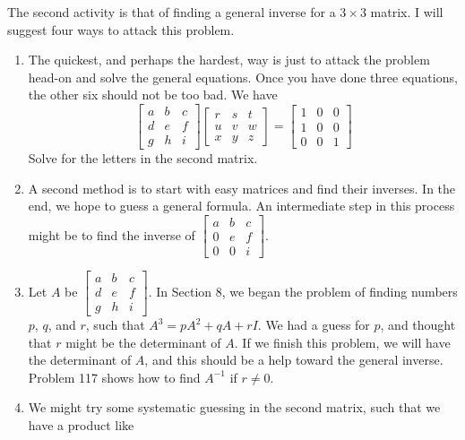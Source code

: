 \documentclass{article}
\begin{document}
The second activity is that of finding a general inverse for a $3 \times 3$ matrix. I will suggest four ways to attack this problem.
\begin{enumerate}[\hspace{0.5cm}(I)]
  \item The quickest, and perhaps the hardest, way is just to attack the problem head-on and solve the general equations. Once you have done three equations, the other six should not be too bad. We have
    \begin{equation*}
      \begin{bmatrix} a & b &c \\ d & e & f \\ g &h & i \end{bmatrix}
      \begin{bmatrix} r & s & t \\ u & v & w \\ x & y & z \end{bmatrix}
      = \begin{bmatrix} 1 & 0 & 0 \\ 1 & 0 & 0 \\ 0 & 0 & 1 \end{bmatrix}
    \end{equation*}
    Solve for the letters in the second matrix.
  \item A second method is to start with easy matrices and find their inverses. In the end, we hope to guess a general formula. An intermediate step in this process might be to find the inverse of $\begin{bmatrix} a & b & c \\ 0 & e & f \\ 0 & 0 & i \end{bmatrix}$.
  \item Let $A$ be $\begin{bmatrix} a & b & c \\ d & e & f \\ g & h & i \end{bmatrix}$. In Section 8, we began the problem of finding numbers $p$, $q$, and $r$, such that $A^3 = pA^2 + qA + rI$. We had a guess for $p$, and thought that $r$ might be the determinant of $A$. If we finish this problem, we will have the determinant of $A$, and this should be a help toward the general inverse. Problem 117 shows how to find $A^{-1}$ if $r \neq 0$.
  \item We might try some systematic guessing in the second matrix, such that we have a product like

\end{enumerate}
\end{document}
